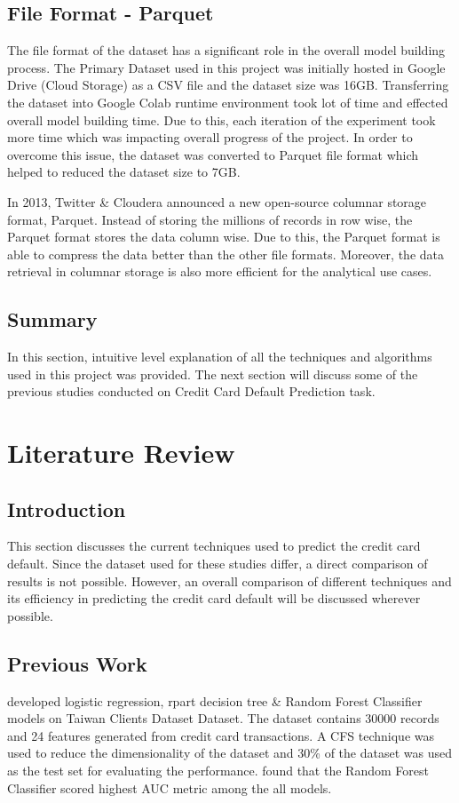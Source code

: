 \documentclass[twoside,11pt,a4paper]{article}
\begin{document}
\subsection{File Format - Parquet}
The file format of the dataset has a significant role in the overall model building process. The Primary Dataset used in this project was initially hosted in Google Drive (Cloud Storage) as a CSV file and the dataset size was 16GB. Transferring the dataset into Google Colab runtime environment took lot of time and effected overall model building time. Due to this, each iteration  of the experiment took more time which was impacting overall progress of the project. In order to overcome this issue, the dataset was converted to Parquet  file format which helped to reduced the dataset size to 7GB.

In 2013, Twitter \& Cloudera announced a new open-source columnar storage format, Parquet. Instead of storing the millions of records in row wise, the Parquet format stores the data column wise. Due to this, the Parquet format is able to compress the data better than the other file formats. Moreover, the data retrieval in columnar storage is also more efficient for the analytical use cases. 


\subsection{Summary}
In this section, intuitive level explanation of all the techniques and algorithms used in this project was provided. The next section will discuss some of the previous studies conducted on Credit Card Default Prediction task.
\vfill
\clearpage
\section{Literature Review}\label{sec:literature_review}
\subsection{Introduction}
This section discusses the current techniques used to predict the credit card default. Since the dataset used for these studies differ, a direct comparison of results is not possible. However, an overall comparison of different techniques and its efficiency in predicting the credit card default will be discussed wherever possible.

\subsection{Previous Work}
\citep{sayjadah2018credit} developed logistic regression, rpart decision tree \& Random Forest Classifier models on Taiwan Clients Dataset \citep{yeh2009comparisons} Dataset. The dataset contains 30000 records and 24 features generated from credit card transactions. A \acf{CFS} technique was used to reduce the dimensionality of the dataset and 30\% of the dataset was used as the test set for evaluating the performance. \citep{sayjadah2018credit} found that the Random Forest Classifier scored highest \acf{AUC} metric among the all models.\\
\end{document}
